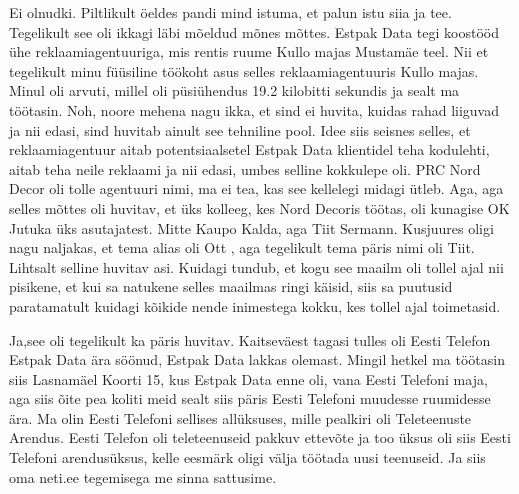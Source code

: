 Ei olnudki. Piltlikult öeldes pandi mind  istuma, et palun istu siia ja tee. 
Tegelikult  see oli ikkagi läbi mõeldud mõnes mõttes. Estpak Data tegi koostööd ühe reklaamiagentuuriga, mis rentis ruume Kullo majas 
Mustamäe teel. Nii et tegelikult minu füüsiline töökoht  asus selles 
reklaamiagentuuris Kullo majas. Minul oli arvuti, millel oli püsiühendus 19.2 
kilobitti sekundis ja sealt ma töötasin. Noh, noore mehena nagu ikka, et sind 
ei huvita, kuidas rahad liiguvad ja nii edasi,  sind huvitab ainult see 
tehniline pool. Idee siis seisnes selles, et reklaamiagentuur aitab 
potentsiaalsetel Estpak Data klientidel teha kodulehti, aitab teha neile 
reklaami ja nii edasi, umbes selline kokkulepe oli. PRC Nord Decor 
oli tolle agentuuri nimi, ma ei tea, kas see kellelegi midagi ütleb. Aga, aga 
selles mõttes oli huvitav, et üks kolleeg, kes Nord Decoris töötas, oli kunagise 
OK Jutuka üks asutajatest. Mitte  
Kaupo Kalda, aga Tiit Sermann. Kusjuures oligi nagu naljakas, et tema alias oli Ott , aga tegelikult tema 
päris nimi oli Tiit. Lihtsalt selline huvitav asi. Kuidagi tundub, et kogu see 
maailm oli tollel ajal nii pisikene, et kui sa natukene selles maailmas ringi 
käisid, siis sa puutusid paratamatult kuidagi kõikide nende inimestega kokku, 
kes tollel ajal toimetasid.


Ja,see oli tegelikult ka päris huvitav. Kaitseväest tagasi tulles oli Eesti 
Telefon  Estpak Data ära söönud, Estpak 
Data lakkas olemast. Mingil hetkel ma töötasin siis Lasnamäel Koorti 15, kus 
Estpak Data enne oli, vana Eesti Telefoni maja, aga siis õite pea koliti meid 
sealt siis päris Eesti Telefoni muudesse ruumidesse ära. Ma olin Eesti Telefoni 
sellises allüksuses, mille pealkiri oli Teleteenuste Arendus.  Eesti Telefon 
oli teleteenuseid pakkuv ettevõte ja too üksus oli siis Eesti Telefoni 
arendusüksus, kelle eesmärk oligi välja töötada uusi teenuseid. Ja siis oma 
neti.ee tegemisega me sinna sattusime. 


